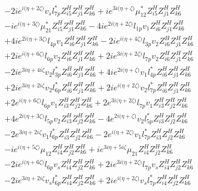 \begin{align}
 &-2 i e^{i \Big(\eta +2 \zeta \Big)} v_s l_{7p}^* Z_{{i 5}}^{H} Z_{{j 1}}^{H} Z_{{k 6}}^{H} +i e^{3 i \Big(\eta +\zeta \Big)} \mu_{12}^* Z_{{i 5}}^{H} Z_{{j 1}}^{H} Z_{{k 6}}^{H} \nonumber \\ 
 &-i e^{i \Big(\eta +3 \zeta \Big)} \mu_{21}^* Z_{{i 5}}^{H} Z_{{j 1}}^{H} Z_{{k 6}}^{H} -4 i e^{2 i \Big(\eta +2 \zeta \Big)} l_{1p} v_1 Z_{{i 6}}^{H} Z_{{j 1}}^{H} Z_{{k 6}}^{H} \nonumber \\ 
 &+4 i e^{2 i \Big(\eta +3 \zeta \Big)} l_{4p} v_1 Z_{{i 6}}^{H} Z_{{j 1}}^{H} Z_{{k 6}}^{H} -2 i e^{i \Big(\eta +4 \zeta \Big)} l_{3p} v_2 Z_{{i 6}}^{H} Z_{{j 1}}^{H} Z_{{k 6}}^{H} \nonumber \\ 
 &+2 i e^{i \Big(\eta +6 \zeta \Big)} l_{6p} v_2 Z_{{i 6}}^{H} Z_{{j 1}}^{H} Z_{{k 6}}^{H} +2 i e^{3 i \Big(\eta +2 \zeta \Big)} l_{7p} v_2 Z_{{i 6}}^{H} Z_{{j 1}}^{H} Z_{{k 6}}^{H} \nonumber \\ 
 &-2 i e^{3 i \eta +4 i \zeta } v_2 l_{3p}^* Z_{{i 6}}^{H} Z_{{j 1}}^{H} Z_{{k 6}}^{H} +4 i e^{2 i \Big(\eta +\zeta \Big)} v_1 l_{4p}^* Z_{{i 6}}^{H} Z_{{j 1}}^{H} Z_{{k 6}}^{H} \nonumber \\ 
 &+2 i e^{3 i \eta +2 i \zeta } v_2 l_{6p}^* Z_{{i 6}}^{H} Z_{{j 1}}^{H} Z_{{k 6}}^{H} +2 i e^{i \Big(\eta +2 \zeta \Big)} v_2 l_{7p}^* Z_{{i 6}}^{H} Z_{{j 1}}^{H} Z_{{k 6}}^{H} \nonumber \\ 
 &+2 e^{i \Big(\eta +6 \zeta \Big)} l_{6p} v_1 Z_{{i 3}}^{H} Z_{{j 2}}^{H} Z_{{k 6}}^{H} +2 e^{3 i \Big(\eta +2 \zeta \Big)} l_{7p} v_1 Z_{{i 3}}^{H} Z_{{j 2}}^{H} Z_{{k 6}}^{H} \nonumber \\ 
 &+4 e^{2 i \Big(\eta +3 \zeta \Big)} l_{5p} v_2 Z_{{i 3}}^{H} Z_{{j 2}}^{H} Z_{{k 6}}^{H} -4 e^{2 i \Big(\eta +\zeta \Big)} v_2 l_{5p}^* Z_{{i 3}}^{H} Z_{{j 2}}^{H} Z_{{k 6}}^{H} \nonumber \\ 
 &-2 e^{3 i \eta +2 i \zeta } v_1 l_{6p}^* Z_{{i 3}}^{H} Z_{{j 2}}^{H} Z_{{k 6}}^{H} -2 e^{i \Big(\eta +2 \zeta \Big)} v_1 l_{7p}^* Z_{{i 3}}^{H} Z_{{j 2}}^{H} Z_{{k 6}}^{H} \nonumber \\ 
 &-i e^{i \Big(\eta +5 \zeta \Big)} \mu_{12} Z_{{i 4}}^{H} Z_{{j 2}}^{H} Z_{{k 6}}^{H} +i e^{3 i \eta +5 i \zeta } \mu_{21} Z_{{i 4}}^{H} Z_{{j 2}}^{H} Z_{{k 6}}^{H} \nonumber \\ 
 &-2 i e^{i \Big(\eta +6 \zeta \Big)} l_{6p} v_s Z_{{i 4}}^{H} Z_{{j 2}}^{H} Z_{{k 6}}^{H} +2 i e^{3 i \Big(\eta +2 \zeta \Big)} l_{7p} v_s Z_{{i 4}}^{H} Z_{{j 2}}^{H} Z_{{k 6}}^{H} \nonumber \\ 
 &-2 i e^{3 i \eta +2 i \zeta } v_s l_{6p}^* Z_{{i 4}}^{H} Z_{{j 2}}^{H} Z_{{k 6}}^{H} +2 i e^{i \Big(\eta +2 \zeta \Big)} v_s l_{7p}^* Z_{{i 4}}^{H} Z_{{j 2}}^{H} Z_{{k 6}}^{H} \nonumber \\ 

\end{align}
